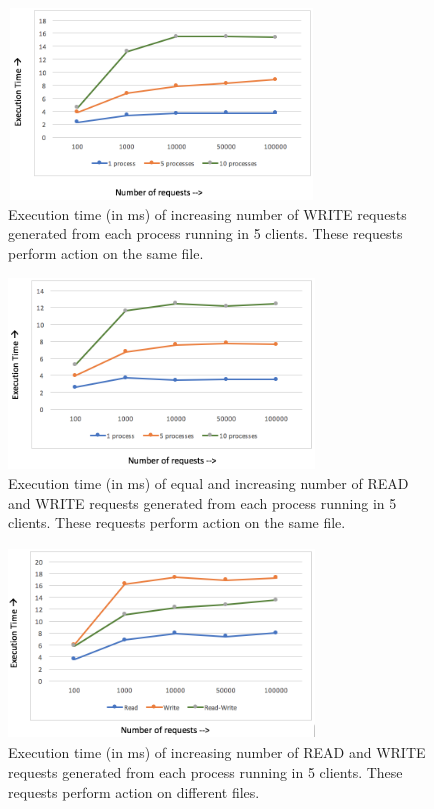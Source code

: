 \begin{figure}
\centering
\includegraphics[height=2in, width=3.2in]{images/FiveClient_Write.png}
\caption{Execution time (in ms) of increasing number of WRITE requests generated from each process running in 5 clients. These requests perform action on the same file.}
\end{figure}

\begin{figure}
\centering
\includegraphics[height=2in, width=3.2in]{images/FiveClient_RW.png}
\caption{Execution time (in ms) of equal and increasing number of READ and WRITE requests generated from each process running in 5 clients. These requests perform action on the same file.}
\end{figure}

\begin{figure}
\centering
\includegraphics[height=2in, width=3.2in]{images/FiveClient_DiffFile.png}
\caption{Execution time (in ms) of increasing number of READ and WRITE requests generated from each process running in 5 clients. These requests perform action on different files.}
\end{figure}








